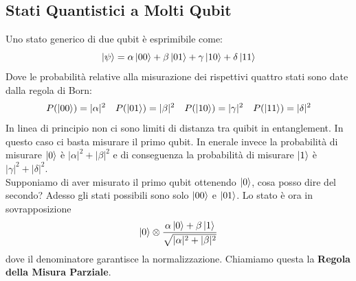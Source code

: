 \documentclass{article}
\begin{document}
    \subsection{Stati Quantistici a Molti Qubit}
    Uno stato generico di due qubit è esprimibile come:
    \[
    \ket{\psi} = \alpha\ket{00} + \beta\ket{01} + \gamma \ket{10} + \delta \ket{11}    
    \]
    Dove le probabilità relative alla misurazione dei rispettivi quattro stati sono date dalla regola di Born:
    \begin{align}
    P(\ket{00}) = |\alpha| ^2 && P(\ket{01}) = |\beta| ^2
    && P(\ket{10}) = |\gamma| ^2 && P(\ket{11}) = |\delta| ^2
    \end{align}
    In linea di principio non ci sono limiti di distanza tra quibit in entanglement. In questo caso ci basta misurare il primo qubit. In enerale invece la probabilità di misurare $\ket{0}$ è $|\alpha|^2+|\beta|^2$ e di conseguenza la probabilità di misurare $\ket{1}$ è $|\gamma|^2+|\delta|^2$.
    \\Supponiamo di aver misurato il primo qubit ottenendo $\ket{0}$, cosa posso dire del secondo? Adesso gli stati possibili sono solo $\ket{00}$ e $\ket{01}$. Lo stato è ora in sovrapposizione
    \begin{equation}
        \ket{0} \otimes \frac{\alpha\ket{0}+ \beta\ket{1}}{\sqrt{|\alpha|^2+|\beta|^2}}
    \end{equation}
    dove il denominatore garantisce la normalizzazione. Chiamiamo questa la \textbf{Regola della Misura Parziale}.
\end{document}
